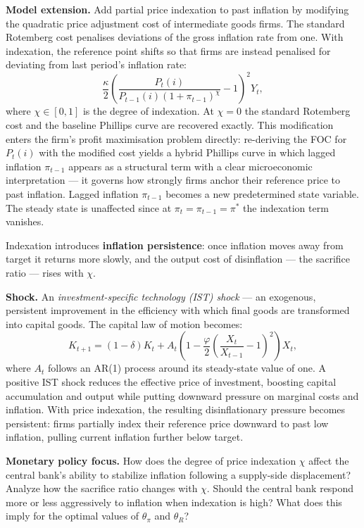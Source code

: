 \documentclass[11pt, a4paper]{article}
\begin{document}
\textbf{Model extension.} Add partial price indexation to past inflation by
modifying the quadratic price adjustment cost of intermediate goods firms. The
standard Rotemberg cost penalises deviations of the gross inflation rate from
one. With indexation, the reference point shifts so that firms are instead
penalised for deviating from last period's inflation rate:
\[
    \frac{\kappa}{2}
    \left(\frac{P_t(i)}{P_{t-1}(i)(1+\pi_{t-1})^\chi}-1\right)^{\!2} Y_t,
\]
where $\chi \in [0,1]$ is the degree of indexation. At $\chi = 0$ the standard
Rotemberg cost and the baseline Phillips curve are recovered exactly. This
modification enters the firm's profit maximisation problem directly: re-deriving
the FOC for $P_t(i)$ with the modified cost yields a hybrid Phillips curve in
which lagged inflation $\pi_{t-1}$ appears as a structural term with a clear
microeconomic interpretation --- it governs how strongly firms anchor their
reference price to past inflation. Lagged inflation $\pi_{t-1}$ becomes a new
predetermined state variable. The steady state is unaffected since at $\pi_t =
\pi_{t-1} = \pi^*$ the indexation term vanishes.

Indexation introduces \textbf{inflation persistence}: once inflation moves away
from target it returns more slowly, and the output cost of disinflation --- the
sacrifice ratio --- rises with $\chi$.

\textbf{Shock.} An \textit{investment-specific technology (IST) shock} --- an
exogenous, persistent improvement in the efficiency with which final goods are
transformed into capital goods. The capital law of motion becomes:
\[
    K_{t+1} = (1-\delta)K_t + A_t
    \left(1-\frac{\varphi}{2}\left(\frac{X_t}{X_{t-1}}-1\right)^{\!2}\right)X_t,
\]
where $A_t$ follows an AR(1) process around its steady-state value of one. A
positive IST shock reduces the effective price of investment, boosting capital
accumulation and output while putting downward pressure on marginal costs and
inflation. With price indexation, the resulting disinflationary pressure becomes
persistent: firms partially index their reference price downward to past low
inflation, pulling current inflation further below target.

\textbf{Monetary policy focus.} How does the degree of price indexation $\chi$
affect the central bank's ability to stabilize inflation following a supply-side
displacement? Analyze how the sacrifice ratio changes with $\chi$. Should the
central bank respond more or less aggressively to inflation when indexation is
high? What does this imply for the optimal values of $\theta_\pi$ and $\theta_R$?
\end{document}
